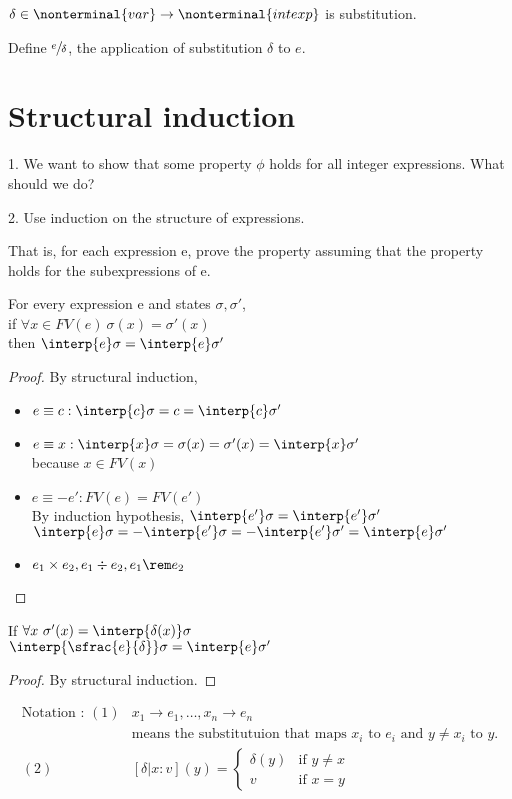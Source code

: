 \documentclass{report}[12pt]
\begin{document}
$\delta \in \nonterminal{var} \rightarrow \nonterminal{intexp}$ is substitution.

Define $\sfrac{e}{\delta}$, the application of substitution $\delta$ to $e$.
\section{Structural induction}
1. We want to show that some property $\phi$ holds for all integer expressions. What should we do?

2. Use induction on the structure of expressions.

That is, for each expression e, prove the property assuming that the property holds for the subexpressions of e.
\begin{lemma}[Coincidence]
    For every expression e and states $\sigma, \sigma'$, \\
    if $\forall x\in FV(e)\ \sigma(x) = \sigma'(x) $ \\
    then $\interp{ e } \sigma = \interp{ e } \sigma'$
\end{lemma}
\begin{proof}
    By structural induction,
    \begin{itemize}
        \item $e \equiv c : \interp{ c } \sigma = c =  \interp{ c } \sigma' $
        \item $e \equiv x : \interp{ x } \sigma = \sigma(x) = \sigma'(x) = \interp{ x } \sigma'$ \\
        because $x \in FV(x)$
        \item $e \equiv -e' : FV(e) = FV(e')$ \\
        By induction hypothesis, $\interp{ e' } \sigma = \interp{ e' } \sigma'$ \\
        $\interp{ e } \sigma = - \interp{ e' } \sigma = - \interp{ e' } \sigma' = \interp{ e } \sigma'$
        \item $e_1 \times e_2, e_1 \div e_2, e_1\rem e_2$
    \end{itemize}
\end{proof}
\begin{lemma}[Substitution]
    If $\forall x\ \sigma'(x) = \interp{ \delta(x) } \sigma $ \\
    $\interp{ \sfrac{e}{\delta} } \sigma = \interp{ e } \sigma'$
\end{lemma}
\begin{proof}
    By structural induction.
\end{proof}
\begin{align*}
    \text{Notation : }(1)  &x_1 \rightarrow e_1, \ldots, x_n \rightarrow e_n \\
    &\text{means the substitutuion that maps } x_i \text{ to }e_i \text{ and }y\neq x_i \text{ to } y. \\
    (2)  &[\delta | x:v] (y) = \begin{cases} \delta(y) & \text{if }y\neq x \\ v &\text{if }x=y\end{cases}
\end{align*}
\end{document}
